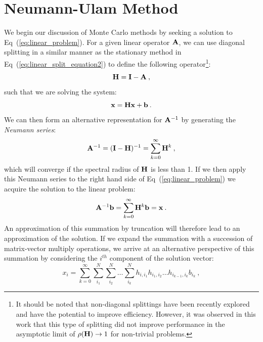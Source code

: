 \section{Neumann-Ulam Method}
\label{sec:mc_preliminaries}
We begin our discussion of Monte Carlo methods by seeking a solution
to Eq~(\ref{eq:linear_problem}). For a given linear operator $\mathbf{A}$,
we can use diagonal splitting in a similar manner as the stationary
method in Eq~(\ref{eq:linear_split_equation2}) to define the following
operator\footnote{It should be noted that non-diagonal splittings have
  been recently explored \citep{srinivasan_monte_2010} and have the
  potential to improve efficiency. However, it was observed in this
  work that this type of splitting did not improve performance in the
  asymptotic limit of $\rho(\mathbf{H}) \rightarrow 1$ for non-trivial
  problems.}:
\begin{equation}
  \mathbf{H} = \mathbf{I} - \mathbf{A}\:,
  \label{eq:linear_mc_iteration_matrix}
\end{equation}
such that we are solving the system:
\begin{equation}
  \mathbf{x} = \mathbf{H} \mathbf{x} + \mathbf{b}\:.
  \label{eq:richardson_split}
\end{equation}
We can then form an alternative representation for $\mathbf{A}^{-1}$ by
generating the \textit{Neumann series}:
\begin{equation}
  \mathbf{A}^{-1} = (\mathbf{I}-\mathbf{H})^{-1} = \sum_{k=0}^{\infty} \mathbf{H}^k\:,
  \label{eq:neumann_series}
\end{equation}
which will converge if the spectral radius of $\mathbf{H}$ is less than
1. If we then apply this Neumann series to the right hand side of
Eq~(\ref{eq:linear_problem}) we acquire the solution to the linear
problem:
\begin{equation}
  \mathbf{A}^{-1}\mathbf{b} = \sum_{k=0}^{\infty} \mathbf{H}^k\mathbf{b} = \mathbf{x}\:.
  \label{eq:neumann_solution}
\end{equation}
An approximation of this summation by truncation will therefore lead
to an approximation of the solution. If we expand the summation with a
succession of matrix-vector multiply operations, we arrive at an
alternative perspective of this summation by considering the $i^{th}$
component of the solution vector:
\begin{equation}
  x_i = \sum_{k=0}^{\infty}\sum_{i_1}^{N}\sum_{i_2}^{N}\ldots
  \sum_{i_k}^{N}h_{i,i_1}h_{i_1,i_2}\ldots h_{i_{k-1},i_k}b_{i_k}\:,
  \label{eq:expanded_neumann_solution}
\end{equation}
